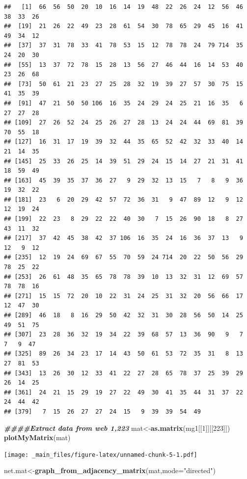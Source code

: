 \documentclass[
]{book}
\newenvironment{Shaded}{\begin{snugshade}}{\end{snugshade}}
\newcommand{\AttributeTok}[1]{\textcolor[rgb]{0.13,0.29,0.53}{#1}}
\newcommand{\DecValTok}[1]{\textcolor[rgb]{0.00,0.00,0.81}{#1}}
\newcommand{\DocumentationTok}[1]{\textcolor[rgb]{0.56,0.35,0.01}{\textbf{\textit{#1}}}}
\newcommand{\FunctionTok}[1]{\textcolor[rgb]{0.13,0.29,0.53}{\textbf{#1}}}
\newcommand{\NormalTok}[1]{#1}
\newcommand{\OtherTok}[1]{\textcolor[rgb]{0.56,0.35,0.01}{#1}}
\newcommand{\StringTok}[1]{\textcolor[rgb]{0.31,0.60,0.02}{#1}}
\theoremstyle{definition}
\theoremstyle{definition}
\theoremstyle{definition}
\theoremstyle{definition}
\theoremstyle{remark}
\begin{document}
\begin{verbatim}
##   [1]  66  56  50  20  10  16  14  19  48  22  26  24  12  56  46  38  33  26
##  [19]  21  26  22  49  23  28  61  54  30  78  65  29  45  16  41  49  34  12
##  [37]  37  31  78  33  41  78  53  15  12  78  78  24  79 714  35  24  20  30
##  [55]  13  37  72  78  15  28  13  56  27  46  44  16  14  53  40  23  26  68
##  [73]  50  61  21  23  27  25  28  32  19  39  27  57  30  75  15  41  35  39
##  [91]  47  21  50  50 106  16  35  24  29  24  25  21  16  35   6  27  27  28
## [109]  27  26  52  24  25  26  27  28  13  24  24  44  69  81  39  70  55  18
## [127]  16  31  17  19  39  32  44  35  65  52  42  32  33  40  14  21  14  35
## [145]  25  33  26  25  14  39  51  29  24  15  14  27  21  31  41  18  59  49
## [163]  45  39  35  37  36  27   9  29  32  13  15   7   8   9  36  19  32  22
## [181]  23   6  20  29  42  57  72  36  31   9  47  89  12   9  12  12  19  24
## [199]  22  23   8  29  22  22  40  30   7  15  26  90  18   8  27  43  11  32
## [217]  37  42  45  38  42  37 106  16  35  24  16  36  37  13   9  12   9  12
## [235]  12  19  24  69  67  55  70  59  24 714  20  22  50  56  29  78  25  22
## [253]  26  61  48  35  65  78  78  39  10  13  32  31  12  69  57  78  78  16
## [271]  15  15  72  20  10  22  31  24  25  31  32  20  56  66  17  12  47  30
## [289]  46  18   8  16  29  50  42  32  31  30  28  56  50  14  25  49  51  75
## [307]  23  28  36  32  19  34  22  39  68  57  13  36  90   9   7   7   9  47
## [325]  89  26  34  23  17  14  43  50  61  53  72  35  31   8  13  27  81  53
## [343]  13  26  30  12  33  41  22  27  28  65  78  37  25  39  29  26  14  25
## [361]  24  21  15  29  19  27  22  49  30  41  35  44  31  37  22  24  44  42
## [379]   7  15  26  27  27  24  15   9  39  39  54  49
\end{verbatim}

\begin{Shaded}
\begin{Highlighting}[]
\DocumentationTok{\#\#\#\#Extract data from web 1,223}
\NormalTok{mat}\OtherTok{\textless{}{-}}\FunctionTok{as.matrix}\NormalTok{(mg1[[}\DecValTok{1}\NormalTok{]][[}\DecValTok{223}\NormalTok{]])}
\FunctionTok{plotMyMatrix}\NormalTok{(mat)}
\end{Highlighting}
\end{Shaded}

\texttt{[image: \_main\_files/figure-latex/unnamed-chunk-5-1.pdf]}

\begin{Shaded}
\begin{Highlighting}[]
\NormalTok{net.mat}\OtherTok{\textless{}{-}}\FunctionTok{graph\_from\_adjacency\_matrix}\NormalTok{(mat,}\AttributeTok{mode=}\StringTok{"directed"}\NormalTok{)}
\end{Highlighting}
\end{Shaded}
\end{document}
